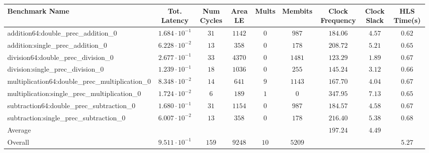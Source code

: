 \begin{tabular}{|l|c|c|c|c|c|c|c|c|}
\hline
Benchmark Name                                   & Tot. Latency            & Num Cycles & Area LE  & Mults  & Membits  & Clock Frequency & Clock Slack & HLS Time(s) \\
\hline
addition64:double\_prec\_addition\_0             & $ 1.684 \cdot 10^{-1} $ & $ 31     $ & $ 1142 $ & $ 0  $ & $ 987  $ & $ 184.06      $ & $ 4.57    $ & $ 0.62    $ \\
addition:single\_prec\_addition\_0               & $ 6.228 \cdot 10^{-2} $ & $ 13     $ & $ 358  $ & $ 0  $ & $ 178  $ & $ 208.72      $ & $ 5.21    $ & $ 0.65    $ \\
division64:double\_prec\_division\_0             & $ 2.677 \cdot 10^{-1} $ & $ 33     $ & $ 4370 $ & $ 0  $ & $ 1481 $ & $ 123.29      $ & $ 1.89    $ & $ 0.67    $ \\
division:single\_prec\_division\_0               & $ 1.239 \cdot 10^{-1} $ & $ 18     $ & $ 1036 $ & $ 0  $ & $ 255  $ & $ 145.24      $ & $ 3.12    $ & $ 0.66    $ \\
multiplication64:double\_prec\_multiplication\_0 & $ 8.348 \cdot 10^{-2} $ & $ 14     $ & $ 641  $ & $ 9  $ & $ 1143 $ & $ 167.70      $ & $ 4.04    $ & $ 0.67    $ \\
multiplication:single\_prec\_multiplication\_0   & $ 1.724 \cdot 10^{-2} $ & $ 6      $ & $ 189  $ & $ 1  $ & $ 0    $ & $ 347.95      $ & $ 7.13    $ & $ 0.65    $ \\
subtraction64:double\_prec\_subtraction\_0       & $ 1.680 \cdot 10^{-1} $ & $ 31     $ & $ 1154 $ & $ 0  $ & $ 987  $ & $ 184.57      $ & $ 4.58    $ & $ 0.67    $ \\
subtraction:single\_prec\_subtraction\_0         & $ 6.007 \cdot 10^{-2} $ & $ 13     $ & $ 358  $ & $ 0  $ & $ 178  $ & $ 216.40      $ & $ 5.38    $ & $ 0.68    $ \\
\hline
Average                                          & $                     $ & $        $ & $      $ & $    $ & $      $ & $ 197.24      $ & $ 4.49    $ & $         $ \\
\hline
Overall                                          & $ 9.511 \cdot 10^{-1} $ & $ 159    $ & $ 9248 $ & $ 10 $ & $ 5209 $ & $             $ & $         $ & $ 5.27    $ \\
\hline
\end{tabular}
